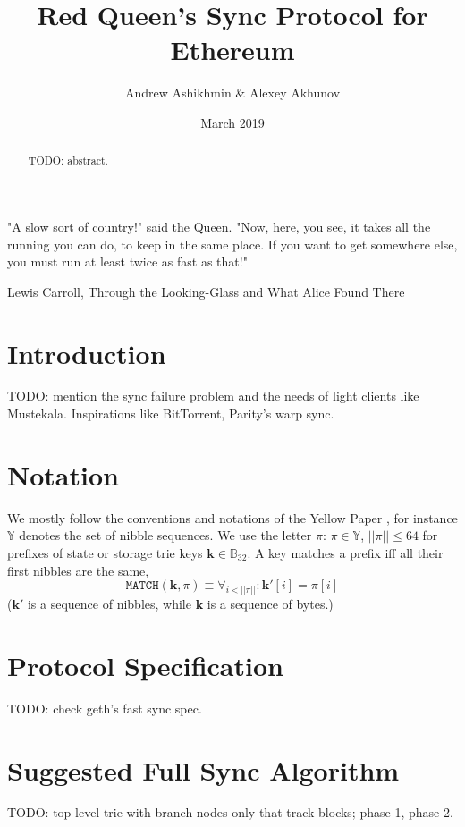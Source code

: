 \documentclass{amsart}
\begin{document}
\title{Red Queen's Sync Protocol for Ethereum}
\author{Andrew Ashikhmin \& Alexey Akhunov}
\date{March 2019}

\begin{abstract}
TODO: abstract.
\end{abstract}

\maketitle

\epigraph{
    "A slow sort of country!" said the Queen.
    "Now, here, you see, it takes all the running you can do, to keep in the same place.
    If you want to get somewhere else, you must run at least twice as fast as that!"
    }{Lewis Carroll, Through the Looking-Glass and What Alice Found There}

\section{Introduction}
TODO: mention the sync failure problem \cite{akhunov_1x_workshop_part1} and the needs of light clients like Mustekala.
Inspirations like BitTorrent, Parity's warp sync.

\section{Notation}
We mostly follow the conventions and notations of the Yellow Paper \cite{yellow_paper},
for instance $\mathbb{Y}$ denotes the set of nibble sequences.
We use the letter $\pi$: $\pi \in \mathbb{Y}$, $||\pi|| \leq 64$ for prefixes of state or storage trie keys $\mathbf{k} \in \mathbb{B}_{32}$.
A key matches a prefix iff all their first nibbles are the same,
$$\texttt{MATCH}(\mathbf{k}, \pi) \equiv \forall_{i < ||\pi||}: \mathbf{k}'[i] = \pi[i]$$
($\mathbf{k}'$ is a sequence of nibbles, while $\mathbf{k}$ is a sequence of bytes.)

\section{Protocol Specification}
TODO: check geth's fast sync spec.

\section{Suggested Full Sync Algorithm}
TODO: top-level trie with branch nodes only that track blocks; phase 1, phase 2.
\end{document}
